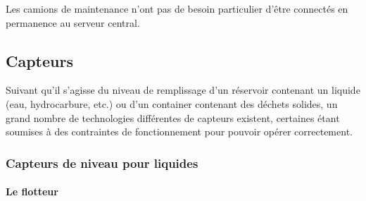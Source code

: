 Les camions de maintenance n'ont pas de besoin particulier d'être connectés en permanence au serveur central.


	 	

 

\subsection{Capteurs}

Suivant qu’il s’agisse du niveau de remplissage d’un réservoir contenant un liquide (eau, hydrocarbure, etc.) ou d’un container contenant des déchets solides, un grand nombre de technologies différentes de capteurs existent, certaines étant soumises à des contraintes de fonctionnement pour pouvoir opérer correctement.

\subsubsection{Capteurs de niveau pour liquides}

\paragraph{Le flotteur}

